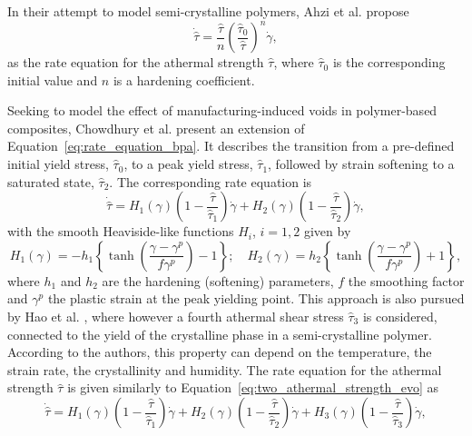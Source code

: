 In their attempt to model semi-crystalline polymers, Ahzi et al. \citep{ahziModelingDeformationBehavior2003} propose
\begin{equation}
  \label{eq:rate_equation_power}
  \dot{\hat \tau} =  \frac{\hat \tau}{n}\left(\frac{\hat\tau_0}{\hat\tau}\right)^n\dot \gamma,
\end{equation}
as the rate equation for the athermal strength $\hat\tau$, where $\hat\tau_0$ is the corresponding initial value and $n$ is a hardening coefficient.

Seeking to model the effect of manufacturing-induced voids in polymer-based composites, Chowdhury et al. \citep{chowdhuryEffectsManufacturingInducedVoids2008} present an extension of Equation~\eqref{eq:rate_equation_bpa}.
It describes the transition from a pre-defined initial yield stress, $\hat\tau_0$, to a peak yield stress, $\hat\tau_1$, followed by strain softening to a saturated state, $\hat\tau_2$.
The corresponding rate equation is
\begin{equation}
	\label{eq:two_athermal_strength_evo}
	\dot{\hat\tau}=H_1(\gamma)\left(1-\frac{\hat\tau}{\hat\tau_1}\right) \dot{\gamma}+H_2(\gamma)\left(1-\frac{\hat\tau}{\hat\tau_2}\right)\dot{\gamma},
\end{equation}
with the smooth Heaviside-like functions $H_i$, $i=1,2$ given by
\begin{equation}
	H_1(\gamma)=-h_1\left\{\tanh \left(\frac{\gamma-\gamma^p}{f \gamma^p}\right)-1\right\} ; \quad H_2(\gamma)=h_2\left\{\tanh \left(\frac{\gamma-\gamma^p}{f \gamma^p}\right)+1\right\},
\end{equation}
where $h_1$ and $h_2$ are the hardening (softening) parameters, $f$ the smoothing factor and $\gamma^p$ the plastic strain at the peak yielding point.
This approach is also pursued by Hao et al. \citep{haoUnifiedAmorphousCrystalline2022}, where however a fourth athermal shear stress $\hat \tau_3$ is considered, connected to the yield of the crystalline phase in a semi-crystalline polymer.
According to the authors, this property can depend on the temperature, the strain rate, the crystallinity and humidity.
The rate equation for the athermal strength $\hat\tau$ is given similarly to Equation~\eqref{eq:two_athermal_strength_evo} as
\begin{equation}
  \label{eq:rate_equation_hao}
	\dot{\hat\tau}=H_1(\gamma) \left(1-\frac{\hat\tau}{\hat\tau_1}\right)  \dot{\gamma}+H_2(\gamma) \left(1-\frac{\hat\tau}{\hat\tau_2}\right)  \dot{\gamma}+H_3(\gamma) \left(1-\frac{\hat\tau}{\hat\tau_3}\right)  \dot{\gamma},
\end{equation}
